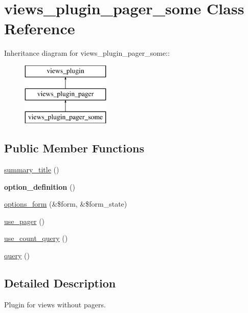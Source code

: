 \hypertarget{classviews__plugin__pager__some}{
\section{views\_\-plugin\_\-pager\_\-some Class Reference}
\label{classviews__plugin__pager__some}
}
Inheritance diagram for views\_\-plugin\_\-pager\_\-some::\begin{figure}[H]
\begin{center}
\leavevmode
\includegraphics[height=3cm]{classviews__plugin__pager__some}
\end{center}
\end{figure}
\subsection*{Public Member Functions}
\begin{DoxyCompactItemize}
\item 
\hyperlink{classviews__plugin__pager__some_a2effa2f5a44d1a73a0b53653658d6ed6}{summary\_\-title} ()
\item 
\hypertarget{classviews__plugin__pager__some_a03e60b07656c670bcab12cebe6904a0b}{
{\bfseries option\_\-definition} ()}
\label{classviews__plugin__pager__some_a03e60b07656c670bcab12cebe6904a0b}

\item 
\hyperlink{classviews__plugin__pager__some_a805f4c0f574ed78f4e3c8451d76a6eb9}{options\_\-form} (\&\$form, \&\$form\_\-state)
\item 
\hyperlink{classviews__plugin__pager__some_a095fbbfc79c16f25158348a0e8eada83}{use\_\-pager} ()
\item 
\hyperlink{classviews__plugin__pager__some_adb625dcd5e5cf98f964f4e1c25681a6e}{use\_\-count\_\-query} ()
\item 
\hyperlink{classviews__plugin__pager__some_a47c807d686e60481be1e6289e3672860}{query} ()
\end{DoxyCompactItemize}


\subsection{Detailed Description}
Plugin for views without pagers. 

